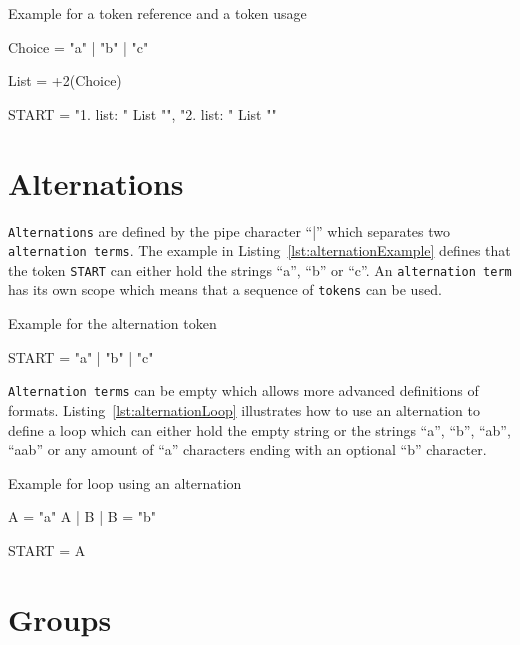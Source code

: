 \begin{listing}
\caption{Example for a token reference and a token usage}
\label{lst:tokenUsageTokenReferenceExample}
\begin{gocode}
Choice = "a" | "b" | "c"

List = +2(Choice)

START = "1. list: " List "\n",
        "2. list: " List "\n"
\end{gocode}
\end{listing}

\section{Alternations}
\label{sec:alternation}

\texttt{Alternations} are defined by the pipe character \enquote{|} which separates two \texttt{alternation terms}. The example in Listing~\ref{lst:alternationExample} defines that the token \texttt{START} can either hold the strings \enquote{a}, \enquote{b} or \enquote{c}. An \texttt{alternation term} has its own scope which means that a sequence of \texttt{tokens} can be used.

\begin{listing}
\caption{Example for the alternation token}
\label{lst:alternationExample}
\begin{gocode}
START = "a" | "b" | "c"
\end{gocode}
\end{listing}

\texttt{Alternation terms} can be empty which allows more advanced definitions of formats. Listing~\ref{lst:alternationLoop} illustrates how to use an alternation to define a loop which can either hold the empty string or the strings \enquote{a}, \enquote{b}, \enquote{ab}, \enquote{aab} or any amount of \enquote{a} characters ending with an optional \enquote{b} character.

\begin{listing}
\caption{Example for loop using an alternation}
\label{lst:alternationLoop}
\begin{gocode}
A = "a" A | B |
B = "b"

START = A
\end{gocode}
\end{listing}

\section{Groups}
\label{sec:groups}

